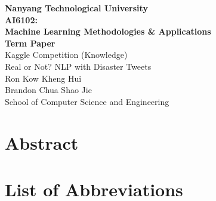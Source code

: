 \documentclass[11pt]{report}
\begin{document}


\begin{center}	
\textbf{\LARGE{Nanyang Technological University}} 
\\[5cm]		
\Large{ }			
\textbf{\LARGE{AI6102: }}
\\
\textbf{\LARGE{Machine Learning Methodologies \& Applications}}
\\
\textbf{\LARGE{Term Paper}}
\\[2cm]
{\LARGE{Kaggle Competition (Knowledge)}}
\\
{\LARGE{Real or Not? NLP with Disaster Tweets}}
\\[2cm]
{\Large{Ron Kow Kheng Hui}}
\\
{\Large{Brandon Chua Shao Jie}}
\\
{\Large{School of Computer Science and Engineering}}
\end{center}


{}


\chapter*{Abstract}


\tableofcontents

{}
\listoftables


{}
\listoffigures

{}
\chapter*{{List of Abbreviations}}

\begin{tabular}{ll}

\end{tabular}	
\end{document}
